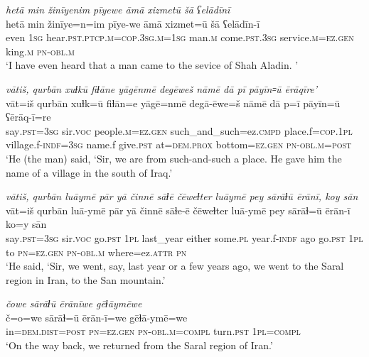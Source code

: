 \ea \label{ZQ.2}
\textit{hetā min žinīyenim pīyewe āmā xizmetū šā ʕelādīnī} \\ 
\gll hetā min žinīye=n=im pīye-we āmā xizmet=ū šā ʕelādīn-ī \\ 
 even \textsc{1sg} hear\textsc{.pst}\textsc{.ptcp}\textsc{.m}\textsc{=cop}\textsc{.3sg}\textsc{.m}\textsc{=\textsc{1sg}} man\textsc{.m} come\textsc{.pst}\textsc{.3sg} service\textsc{.m}\textsc{=ez.gen} king\textsc{.m} \textsc{pn}\textsc{-obl}\textsc{.m} \\ 
\glt `I have even heard that a man came to the sevice of Shah Aladin. '
\z 
 
\ea \label{ZQ.5}
\textit{vātiš, qurbān xuɫkū fiɫāne yāgēnmē degēweš nāmē dā pī pāyīn꞊ū ērāqīre'} \\ 
\gll vāt=iš qurbān xuɫk=ū fiɫān=e yāgē=nmē degā-ēwe=š nāmē dā p=ī pāyīn=ū ʕērāq-ī=re \\ 
 say\textsc{.pst}\textsc{=3sg} sir.\textsc{voc} people\textsc{.m}\textsc{=ez.gen} such\_and\_such=ez\textsc{.cmpd} place.f\textsc{=cop}\textsc{.\textsc{1pl}} village.f\textsc{-indf}\textsc{=3sg} name.f give\textsc{.pst} at=\textsc{dem.prox} bottom\textsc{=ez.gen} \textsc{pn}\textsc{-obl}\textsc{.m}\textsc{=\textsc{post}} \\ 
\glt `He (the man) said, ‘Sir, we are from such-and-such a place. He gave him the name of a village in the south of Iraq.'
\z 
 
\ea \label{ZQ.9}
\textit{vātiš, qurbān luāymē pār yā činnē sāɫē čēweɫter luāymē pey sārāɫū ērānī, koy sān} \\ 
\gll vāt=iš qurbān luā-ymē pār yā činnē sāɫe-ē čēweɫter luā-ymē pey sārāɫ=ū ērān-ī ko=y sān \\ 
 say\textsc{.pst}\textsc{=3sg} sir.\textsc{voc} go\textsc{.pst} \textsc{1pl} last\_year either some\textsc{.pl} year.f\textsc{-indf} ago go\textsc{.pst} \textsc{1pl} to \textsc{pn}\textsc{=ez.gen} \textsc{pn}\textsc{-obl}\textsc{.m} where=ez.\textsc{attr} \textsc{pn} \\ 
\glt `He said, ‘Sir, we went, say, last year or a few years ago, we went to the Saral region in Iran, to the San mountain.'
\z 
 
\ea \label{ZQ.10}
\textit{čowe sārāɫū ērānīwe gēɫāymēwe} \\ 
\gll č=o=we sārāɫ=ū ērān-ī=we gēɫā-ymē=we \\ 
 in=\textsc{dem.dist}\textsc{=\textsc{post}} \textsc{pn}\textsc{=ez.gen} \textsc{pn}\textsc{-obl}\textsc{.m}\textsc{=compl} turn\textsc{.pst} \textsc{1pl}\textsc{=compl} \\ 
\glt `On the way back, we returned from the Saral region of Iran.'
\z 
 
